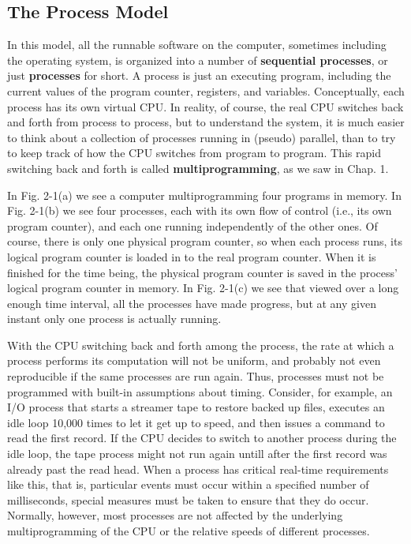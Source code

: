 \documentclass{book}
\newcommand {\kw}  [1] {\textbf{#1}}
\begin{document}
\subsection{The Process Model}
In this model, all the runnable software on the computer, sometimes including the operating system, 
is organized into a number of \kw{sequential processes}, or just \kw{processes} for short.
A process is just an executing program, including the current values of the program counter, registers, and variables.
Conceptually, each process has its own virtual CPU.
In reality, of course, the real CPU switches back and forth from process to process,
but to understand the system, it is much easier to think about a collection of processes running in (pseudo) parallel,
than to try to keep track of how the CPU switches from program to program.
This rapid switching back and forth is called \kw{multiprogramming}, as we saw in Chap. 1.

In Fig. 2-1(a) we see a computer multiprogramming four programs in memory.
In Fig. 2-1(b) we see four processes, each with its own flow of control (i.e., its own program counter), 
and each one running independently of the other ones.
Of course, there is only one physical program counter, so when each process runs, 
its logical program counter is loaded in to the real program counter. 
When it is finished for the time being, the physical program counter is saved in the process' logical program counter in memory.
In Fig. 2-1(c) we see that viewed over a long enough time interval, all the processes have made progress,
but at any given instant only one process is actually running.

With the CPU switching back and forth among the process, the rate at which a process performs its computation will not be uniform, 
and probably not even reproducible if the same processes are run again.
Thus, processes must not be programmed with built-in assumptions about timing.
Consider, for example, an I/O process that starts a streamer tape to restore backed up files,
executes an idle loop 10,000 times to let it get up to speed, and then issues a command to read the first record.
If the CPU decides to switch to another process during the idle loop,
the tape process might not run again untill after the first record was already past the read head.
When a process has critical real-time requirements like this, that is, 
particular events must occur within a specified number of milliseconds, special measures must be taken to ensure that they do occur.
Normally, however, most processes are not affected by the underlying multiprogramming of the CPU or the relative speeds of different processes.
\end{document}

